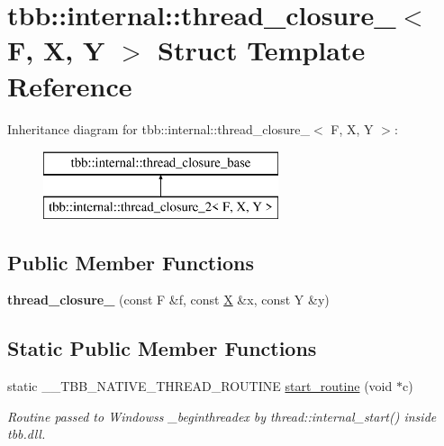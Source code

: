 \hypertarget{structtbb_1_1internal_1_1thread__closure__2}{}\section{tbb\+:\+:internal\+:\+:thread\+\_\+closure\+\_$<$ F, X, Y $>$ Struct Template Reference}
\label{structtbb_1_1internal_1_1thread__closure__2}
Inheritance diagram for tbb\+:\+:internal\+:\+:thread\+\_\+closure\+\_$<$ F, X, Y $>$\+:\begin{figure}[H]
\begin{center}
\leavevmode
\includegraphics[height=2.000000cm]{structtbb_1_1internal_1_1thread__closure__2}
\end{center}
\end{figure}
\subsection*{Public Member Functions}
\begin{DoxyCompactItemize}
\item 
\hypertarget{structtbb_1_1internal_1_1thread__closure__2_aa5f65ba1d019063487f425021ca2ba59}{}{\bfseries thread\+\_\+closure\+\_} (const F \&f, const \hyperlink{structX}{X} \&x, const Y \&y)\label{structtbb_1_1internal_1_1thread__closure__2_aa5f65ba1d019063487f425021ca2ba59}

\end{DoxyCompactItemize}
\subsection*{Static Public Member Functions}
\begin{DoxyCompactItemize}
\item 
\hypertarget{structtbb_1_1internal_1_1thread__closure__2_a29003179f98d768622c72b9ab5cfe8f6}{}static \+\_\+\+\_\+\+T\+B\+B\+\_\+\+N\+A\+T\+I\+V\+E\+\_\+\+T\+H\+R\+E\+A\+D\+\_\+\+R\+O\+U\+T\+I\+N\+E \hyperlink{structtbb_1_1internal_1_1thread__closure__2_a29003179f98d768622c72b9ab5cfe8f6}{start\+\_\+routine} (void $\ast$c)\label{structtbb_1_1internal_1_1thread__closure__2_a29003179f98d768622c72b9ab5cfe8f6}

\begin{DoxyCompactList}\small\item\em Routine passed to Windows\textquotesingle{}s \+\_\+beginthreadex by thread\+::internal\+\_\+start() inside tbb.\+dll. \end{DoxyCompactList}\end{DoxyCompactItemize}
